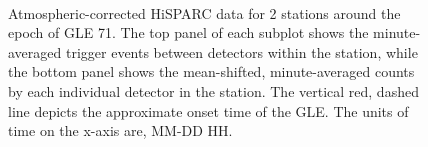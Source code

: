 \begin{figure}[ht!]
	\centering
	 \\
	
	
	\caption{Atmospheric-corrected HiSPARC data for 2 stations around the epoch of GLE 71. The top panel of each subplot shows the minute-averaged trigger events between detectors within the station, while the bottom panel shows the mean-shifted, minute-averaged counts by each individual detector in the station. The vertical red, dashed line depicts the approximate onset time of the GLE. The units of time on the x-axis are, MM-DD HH.}
	\label{fig:GLE_71_Pcorr}
\end{figure}

